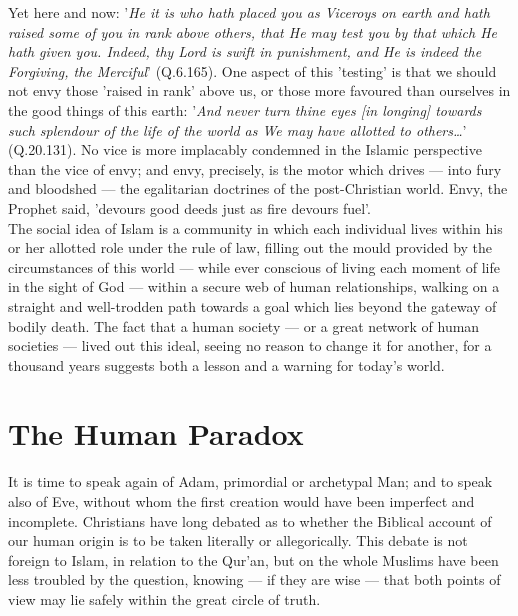 \documentclass[10pt, twoside]{book}
\begin{document}
Yet here and now: '\emph{He it is who hath placed you as Viceroys on earth and hath raised some of you in 
rank above others, that He may test you by that which He hath given you. Indeed, thy Lord is swift in 
punishment, and He is indeed the Forgiving, the Merciful}' (Q.6.165). One aspect of this 'testing' is 
that we should not envy those 'raised in rank' above us, or those more favoured than ourselves in the 
good things of this earth: '\emph{And never turn thine eyes [in longing] towards such splendour of the life 
of the world as We may have allotted to others\ldots{}}' (Q.20.131). No vice is more implacably condemned 
in the Islamic perspective than the vice of envy; and envy, precisely, is the motor which drives --- 
into fury and bloodshed --- the egalitarian doctrines of the post\hyp{}Christian world. Envy, the Prophet 
said, 'devours good deeds just as fire devours fuel'. \\

The social idea of Islam is a community in which each individual lives within his or her allotted 
role under the rule of law, filling out the mould provided by the circumstances of this world --- while 
ever conscious of living each moment of life in the sight of God --- within a secure web of human 
relationships, walking on a straight and well\hyp{}trodden path towards a goal which lies beyond the 
gateway of bodily death. The fact that a human society --- or a great network of human societies --- 
lived out this ideal, seeing no reason to change it for another, for a thousand years suggests both a 
lesson and a warning for today's world. \\


\chapter{The Human Paradox}


It is time to speak again of Adam, primordial or archetypal Man; and to speak also of Eve, without 
whom the first creation would have been imperfect and incomplete. Christians have long debated as to 
whether the Biblical account of our human origin is to be taken literally or allegorically. This 
debate is not foreign to Islam, in relation to the Qur'an, but on the whole Muslims have been less 
troubled by the question, knowing --- if they are wise --- that both points of view may lie safely within 
the great circle of truth. \\
\end{document}
